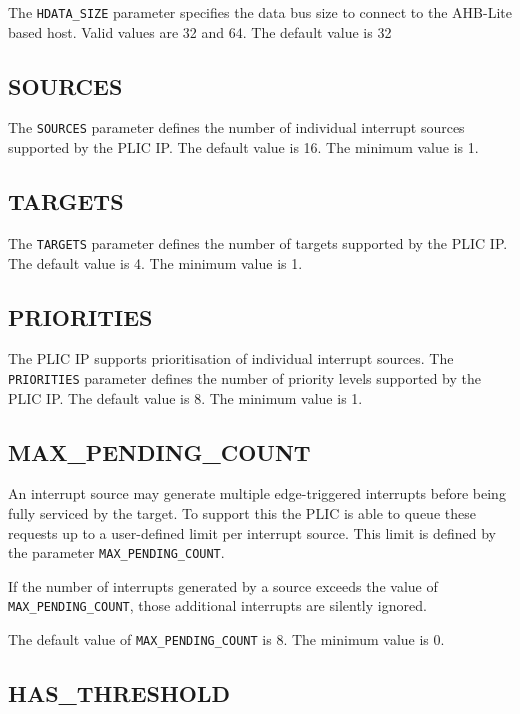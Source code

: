 The \texttt{HDATA\_SIZE} parameter specifies the data bus size to
connect to the AHB-Lite based host. Valid values are 32 and 64. The
default value is 32

\hypertarget{SOURCES}{\subsection{SOURCES}\label{sec:SOURCES}}

The \texttt{SOURCES} parameter defines the number of individual
interrupt sources supported by the PLIC IP. The default value is 16. The
minimum value is 1.

\hypertarget{TARGETS}{\subsection{TARGETS}\label{sec:TARGETS}}

The \texttt{TARGETS} parameter defines the number of targets supported
by the PLIC IP. The default value is 4. The minimum value is 1.

\subsection{PRIORITIES}

The PLIC IP supports prioritisation of individual interrupt sources. The \texttt{PRIORITIES} parameter defines the number of priority levels supported by the PLIC IP. The default value is 8. The minimum value is 1.

\subsection{MAX\_PENDING\_COUNT}

An interrupt source may generate multiple edge-triggered interrupts before being fully serviced by the target. To support this the PLIC is able to queue these requests up to a user-defined limit per interrupt source. This limit is defined by the parameter {\tt MAX\_PENDING\_COUNT}.

If the number of interrupts generated by a source exceeds the value of {\tt MAX\_PENDING\_COUNT}, those additional interrupts are silently ignored.

The default value of {\tt MAX\_PENDING\_COUNT} is 8. The minimum value is 0.

\subsection{HAS\_THRESHOLD}

